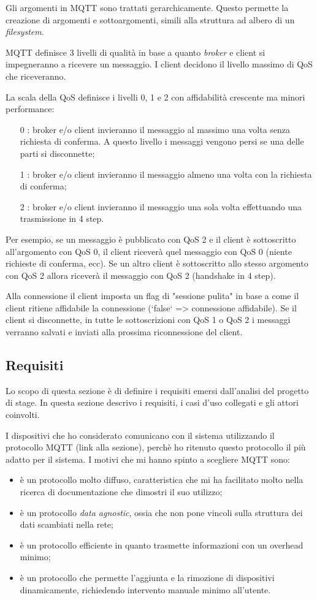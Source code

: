 Gli argomenti in MQTT sono trattati gerarchicamente. Questo permette la creazione di argomenti e sottoargomenti, simili alla struttura ad albero di un \emph{filesystem}.

MQTT definisce 3 livelli di qualità in base a quanto \emph{broker} e client si impegneranno a ricevere un messaggio.
I client decidono il livello massimo di QoS che riceveranno.

La scala della QoS definisce i livelli 0, 1 e 2 con affidabilità crescente ma minori performance:
\begin{itemize}
	\item [0]: broker e/o client invieranno il messaggio al massimo una volta senza richiesta di conferma. A questo livello i messaggi vengono persi se una delle parti si disconnette;
	\item [1]: broker e/o client invieranno il messaggio almeno una volta con la richiesta di conferma;
	\item [2]: broker e/o client invieranno il messaggio una sola volta effettuando una trasmissione in 4 step.
\end{itemize}

Per esempio, se un messaggio è pubblicato con QoS 2 e il client è sottoscritto all'argomento con QoS 0, il client riceverà quel messaggio con QoS 0 (niente richieste di conferma, ecc).
Se un altro client è sottoscritto allo stesso argomento con QoS 2 allora riceverà il messaggio con QoS 2 (handshake in 4 step).

Alla connessione il client imposta un flag di "sessione pulita" in base a come il client ritiene affidabile la connessione (`false` => connessione affidabile). Se il client si disconnette, in tutte le sottoscrizioni con QoS 1 o QoS 2 i messaggi verranno salvati e inviati alla prossima riconnessione del client.

\subsection{Requisiti}

Lo scopo di questa sezione è di definire i requisiti emersi dall’analisi del progetto di stage.
In questa sezione descrivo i requisiti, i casi d'uso collegati e gli attori coinvolti.

I dispositivi che ho considerato comunicano con il sistema utilizzando il protocollo MQTT (link alla sezione), perchè ho ritenuto questo protocollo il più adatto per il sistema.
I motivi che mi hanno spinto a scegliere MQTT sono:
\begin{itemize}
	\item è un protocollo molto diffuso, caratteristica che mi ha facilitato molto nella ricerca di documentazione che dimostri il suo utilizzo; 
	\item è un protocollo \emph{data agnostic}, ossia che non pone vincoli sulla struttura dei dati scambiati nella rete;
	\item è un protocollo efficiente in quanto trasmette informazioni con un overhead minimo;
	\item è un protocollo che permette l'aggiunta e la rimozione di dispositivi dinamicamente,  richiedendo intervento manuale minimo all'utente.
\end{itemize}


